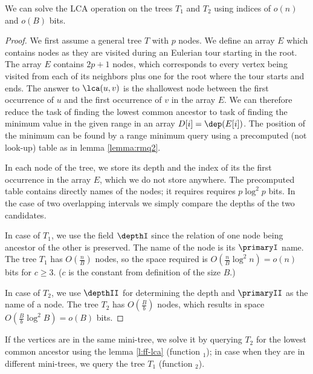 \begin{lemma}\label{l:ff-lca}
	We can solve the LCA operation on the trees $T_1$ and $T_2$ using indices of $o(n)$ and $o(B)$ bits.
\end{lemma}
\begin{proof}
	We first assume a general tree $T$ with $p$ nodes.
	We define an array $E$ which contains nodes as they are visited during an Eulerian tour starting in the root.
	The array $E$ contains $2p + 1$ nodes, which corresponds to every vertex being visited from each of its neighbors plus one for the root where the tour starts and ends.
	The answer to $\lca(u, v)$ is the shallowest node between the first occurrence of $u$ and the first occurrence of $v$ in the array $E$.
	We can therefore reduce the task of finding the lowest common ancestor to task of finding the minimum value in the given range in an array $D[i] = \dep(E[i])$.
	The position of the minimum can be found by a range minimum query using a precomputed (not look-up) table as in lemma \ref{lemma:rmq2}.
	
	In each node of the tree, we store its depth and the index of its the first occurrence in the array $E$, which we do not store anywhere.
	The precomputed table contains directly names of the nodes; it requires requires $p \log^2 p$ bits.
	In the case of two overlapping intervals we simply compare the depths of the two candidates.
	
	In case of $T_1$, we use the field $\depthI$ since the relation of one node being ancestor of the other is preserved.
	The name of the node is its $\primaryI$ name.
	The tree $T_1$ has $O(\frac{n}{B})$ nodes, so the space required is $O(\frac{n}{B} \log^2 n) = o(n)$ bits for $c \ge 3$.
	($c$ is the constant from definition of the size $B$.)
	
	In case of $T_2$, we use $\depthII$ for determining the depth and $\primaryII$ as the name of a node.
	The tree $T_2$ has $O(\frac{B}{b})$ nodes, which results in space $O(\frac{B}{b} \log^2 B) = o(B)$ bits.
\end{proof}

If the vertices are in the same mini-tree, we solve it by querying $T_2$ for the lowest common ancestor using the lemma \ref{l:ff-lca} (function \lca$_1$); in case when they are in different mini-trees, we query the tree $T_1$ (function \lca$_2$).

